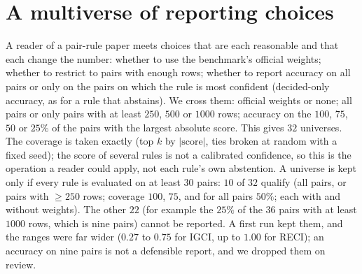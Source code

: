 \section{A multiverse of reporting choices}\label{sec:multi}

A reader of a pair-rule paper meets choices that are each reasonable and that each change the number: whether to use the benchmark's official weights; whether to restrict to pairs with enough rows; whether to report accuracy on all pairs or only on the pairs on which the rule is most confident (decided-only accuracy, as for a rule that abstains). We cross them: official weights or none; all pairs or only pairs with at least $250$, $500$ or $1000$ rows; accuracy on the $100$, $75$, $50$ or $25\%$ of the pairs with the largest absolute score. This gives $32$ universes. The coverage is taken exactly (top $k$ by $|\mathrm{score}|$, ties broken at random with a fixed seed); the score of several rules is not a calibrated confidence, so this is the operation a reader could apply, not each rule's own abstention. A universe is kept only if every rule is evaluated on at least $30$ pairs: $10$ of $32$ qualify (all pairs, or pairs with $\ge 250$ rows; coverage $100$, $75$, and for all pairs $50\%$; each with and without weights). The other $22$ (for example the $25\%$ of the $36$ pairs with at least $1000$ rows, which is nine pairs) cannot be reported. A first run kept them, and the ranges were far wider ($0.27$ to $0.75$ for IGCI, up to $1.00$ for RECI); an accuracy on nine pairs is not a defensible report, and we dropped them on review.

